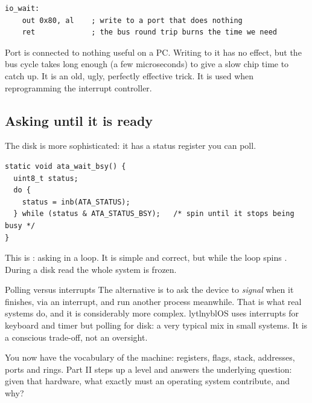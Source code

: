 \begin{lstlisting}[style=asm]
io_wait:
    out 0x80, al    ; write to a port that does nothing
    ret             ; the bus round trip burns the time we need
\end{lstlisting}

Port  is connected to nothing useful on a PC. Writing to it has no effect, but the bus
cycle takes long enough (a few microseconds) to give a slow chip time to catch up. It is an old,
ugly, perfectly effective trick. It is used when reprogramming the interrupt controller.

\subsection{Asking until it is ready}

The disk is more sophisticated: it has a status register you can poll.

\begin{lstlisting}[style=c]
static void ata_wait_bsy() {
  uint8_t status;
  do {
    status = inb(ATA_STATUS);
  } while (status & ATA_STATUS_BSY);   /* spin until it stops being busy */
}
\end{lstlisting}

This is : asking in a loop. It is simple and correct, but while the loop spins
. During a disk read the whole system is frozen.

\begin{warn}{Polling versus interrupts}
The alternative is to ask the device to \emph{signal} when it finishes, via an interrupt, and run
another process meanwhile. That is what real systems do, and it is considerably more complex.
lytlnyblOS uses interrupts for keyboard and timer but polling for disk: a very typical mix in
small systems. It is a conscious trade-off, not an oversight.
\end{warn}

\begin{summary}
You now have the vocabulary of the machine: registers, flags, stack, addresses, ports and rings.
Part II steps up a level and answers the underlying question: given that hardware, what exactly
must an operating system contribute, and why?
\end{summary}

